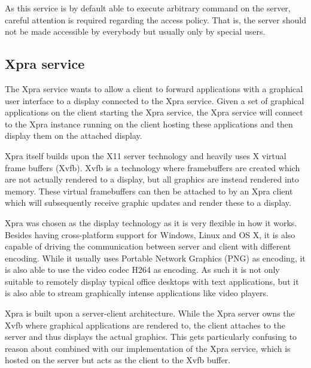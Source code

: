 As this service is by default able to execute arbitrary command on the server, careful attention is required regarding the access policy.
That is, the server should not be made accessible by everybody but usually only by special users.

\subsection{Xpra service}
\label{sec:xpra-service}

The Xpra service wants to allow a client to forward applications with a graphical user interface to a display connected to the Xpra service.
Given a set of graphical applications on the client starting the Xpra service, the Xpra service will connect to the Xpra instance running on the client hosting these applications and then display them on the attached display.

Xpra itself builds upon the X11 server technology and heavily uses X virtual frame buffers (Xvfb).
Xvfb is a technology where framebuffers are created which are not actually rendered to a display, but all graphics are instead rendered into memory.
These virtual framebuffers can then be attached to by an Xpra client which will subsequently receive graphic updates and render these to a display.

Xpra was chosen as the display technology as it is very flexible in how it works.
Besides having cross-platform support for Windows, Linux and OS X, it is also capable of driving the communication between server and client with different encoding.
While it usually uses Portable Network Graphics (PNG) as encoding, it is also able to use the video codec H264 as encoding.
As such it is not only suitable to remotely display typical office desktops with text applications, but it is also able to stream graphically intense applications like video players.

Xpra is built upon a server-client architecture.
While the Xpra server owns the Xvfb where graphical applications are rendered to, the client attaches to the server and thus displays the actual graphics.
This gets particularly confusing to reason about combined with our implementation of the Xpra service, which is hosted on the server but acts as the client to the Xvfb buffer.

